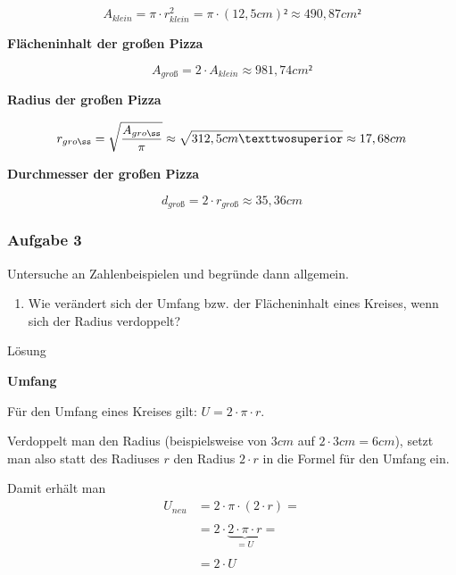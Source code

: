 \documentclass[
  ngerman,
]{book}
\providecommand{\tightlist}{%
  \setlength{\itemsep}{0pt}\setlength{\parskip}{0pt}}
\begin{document}
\[ A_{klein}= \pi \cdot r^2_{klein} = \pi \cdot (12,5cm)² \approx 490,87 cm²\]

\textbf{Flächeninhalt der großen Pizza}

\[A_{groß} = 2 \cdot A_{klein} \approx 981,74 cm²\]

\textbf{Radius der großen Pizza}

\[r_{groß}= \sqrt{A_{groß} \over \pi} \approx \sqrt{312,5cm²} \approx 17,68 cm\]

\textbf{Durchmesser der großen Pizza}

\[d_{groß}= 2 \cdot r_{groß} \approx 35,36 cm\]

\hypertarget{section-37}{%
\subsubsection*{}\label{section-37}}

\hypertarget{aufgabe-3-6}{%
\subsubsection*{Aufgabe 3}\label{aufgabe-3-6}}

Untersuche an Zahlenbeispielen und begründe dann allgemein.

\begin{enumerate}
\def\labelenumi{\alph{enumi})}
\tightlist
\item
  Wie verändert sich der Umfang bzw. der Flächeninhalt eines Kreises, wenn sich der Radius verdoppelt?
\end{enumerate}

Lösung

\textbf{Umfang}

Für den Umfang eines Kreises gilt: \(U = 2 \cdot \pi \cdot r\).

Verdoppelt man den Radius (beispielsweise von \(3cm\) auf \(2 \cdot 3cm =6cm\)), setzt man also statt des Radiuses \(r\) den Radius \(2 \cdot r\) in die Formel für den Umfang ein.

Damit erhält man
\[ \begin{align} U_{neu} &= 2 \cdot \pi \cdot (2 \cdot r)= \\
                        {}\\
                         &= 2 \cdot \underbrace{2 \cdot \pi \cdot r}_{= U} =\\
                         {}\\
                         &= 2 \cdot U \end{align}\]
\end{document}
